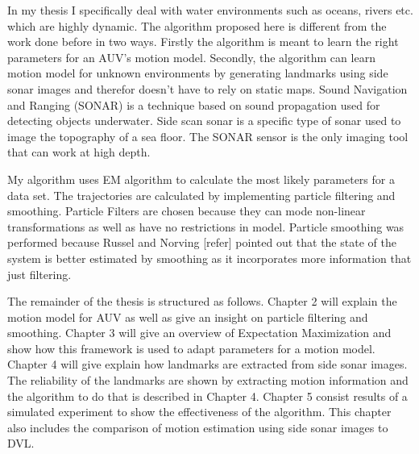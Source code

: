 \documentclass[12pt,draft]{dalcsthesis}
\begin{document}
In my thesis I specifically deal with water environments such as oceans, rivers etc. which are highly dynamic.  The algorithm proposed here is different from the work done before in two ways. Firstly the algorithm is meant to learn the right parameters for an AUV’s motion model. Secondly, the algorithm can learn motion model for unknown environments by generating landmarks using side sonar images and therefor doesn’t have to rely on static maps. Sound Navigation and Ranging (SONAR) is a technique based on sound propagation used for detecting objects underwater. Side scan sonar is a specific type of sonar used to image the topography of a sea floor.  The SONAR sensor is the only imaging tool that can work at high depth. 

My algorithm uses EM algorithm to calculate the most likely parameters for a data set.  The trajectories are calculated by implementing particle filtering and smoothing.  Particle Filters are chosen because they can mode non-linear transformations as well as have no restrictions in model. Particle smoothing was performed because Russel and Norving [refer] pointed out that the state of the system is better estimated by smoothing as it incorporates more information that just filtering. 

The remainder of the thesis is structured as follows. Chapter 2 will explain the motion model for AUV as well as give an insight on particle filtering and smoothing. Chapter 3 will give an overview of Expectation Maximization and show how this framework is used to adapt parameters for a motion model. Chapter 4 will give explain how landmarks are extracted from side sonar images. The reliability of the landmarks are shown by extracting motion information and the algorithm to do that is described in Chapter 4. Chapter 5 consist results of a simulated experiment to show the effectiveness of the algorithm. This chapter also includes the comparison of motion estimation using side sonar images to DVL.
 
\end{document}
